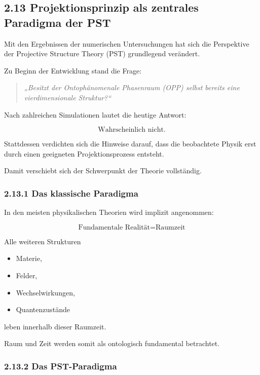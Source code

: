 \subsection{2.13 Projektionsprinzip als zentrales Paradigma der PST}

Mit den Ergebnissen der numerischen Untersuchungen hat sich die Perspektive der
Projective Structure Theory (PST) grundlegend verändert.

Zu Beginn der Entwicklung stand die Frage:

\begin{quote}
\emph{„Besitzt der Ontophänomenale Phasenraum (OPP) selbst bereits eine
vierdimensionale Struktur?“}
\end{quote}

Nach zahlreichen Simulationen lautet die heutige Antwort:

\[
\boxed{
\text{Wahrscheinlich nicht.}
}
\]

Stattdessen verdichten sich die Hinweise darauf, dass die beobachtete Physik
erst durch einen geeigneten Projektionsprozess entsteht.

Damit verschiebt sich der Schwerpunkt der Theorie vollständig.


\subsubsection*{2.13.1 Das klassische Paradigma}

In den meisten physikalischen Theorien wird implizit angenommen:

\[
\boxed{
\text{Fundamentale Realität}
=
\text{Raumzeit}
}
\]

Alle weiteren Strukturen

\begin{itemize}
\item Materie,
\item Felder,
\item Wechselwirkungen,
\item Quantenzustände
\end{itemize}

leben innerhalb dieser Raumzeit.

Raum und Zeit werden somit als ontologisch fundamental betrachtet.


\subsubsection*{2.13.2 Das PST-Paradigma}

